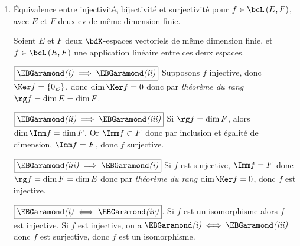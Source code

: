 \documentclass[a4paper,french,bookmarks]{article}
\begin{document}
\begin{enumerate}
    \newpage
    
    \item Équivalence entre injectivité, bijectivité et surjectivité pour $f \in \bcL\left(E, F\right)$, avec $E$ et $F$ deux ev de même dimension finie.
    
    \noafter
    \yesafter\nobefore
    \begin{nproof}
        Soient $E$ et $F$ deux $\bdK$-espaces vectoriels de même dimension finie, et $f \in \bcL\left(E, F\right)$ une application linéaire entre ces deux espaces.
        
        \begin{enumerate}
            \itt $\boxed{\text{\EBGaramond\itshape(i)} \implies \text{\EBGaramond\itshape(ii)}}$ Supposons $f$ injective, donc $\Ker f = \left\{0_E\right\}$, donc $\dim \Ker f = 0$ donc par \textit{théorème du rang} $\rg f = \dim E = \dim F$.
            
            \itt $\boxed{\text{\EBGaramond\itshape(ii)} \implies \text{\EBGaramond\itshape(iii)}}$ Si $\rg f = \dim F$, alors $\dim \Imm f = \dim F$. Or $\Imm f \subset F$ donc par inclusion et égalité de dimension, $\Imm f = F$, donc $f$ surjective.
            
            \itt $\boxed{\text{\EBGaramond\itshape(iii)} \implies \text{\EBGaramond\itshape(i)}}$ Si $f$ est surjective, $\Imm f = F$ donc $\rg f = \dim F = \dim E$ donc par \textit{théorème du rang} $\dim \Ker f = 0$, donc $f$ est injective.
            
            \itt $\boxed{\text{\EBGaramond\itshape(i)} \iff \text{\EBGaramond\itshape(iv)}}$. Si $f$ est un isomorphisme alors $f$ est injective. Si $f$ est injective, on a $\text{\EBGaramond\itshape(i)} \iff \text{\EBGaramond\itshape(iii)}$ donc $f$ est surjective, donc $f$ est un isomorphisme.
        \end{enumerate}
    \end{nproof}
    \yesbefore
    

\end{enumerate}
\end{document}
